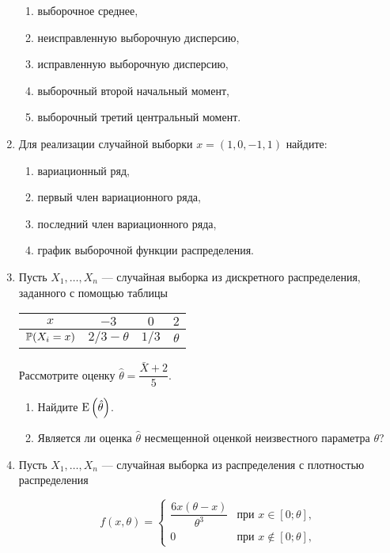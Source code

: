 \begin{enumerate}
\begin{enumerate}
\item выборочное среднее,
\item неисправленную выборочную дисперсию,
\item исправленную выборочную дисперсию,
\item выборочный второй начальный момент,
\item выборочный третий центральный момент.
\end{enumerate}

\item Для реализации случайной выборки $x=(1,0,-1,1)$ найдите:

\begin{enumerate}
\item вариационный ряд,
\item первый член вариационного ряда,
\item последний член вариационного ряда,
\item график выборочной функции распределения.
\end{enumerate}

\item Пусть $X_1, \ldots,X_n$ — случайная выборка из дискретного распределения, заданного с помощью таблицы

\begin{center}
\begin{tabular}{cccc}
\toprule
 $x$ & $-3$  &$ 0 $  & $2 $  \\
 \midrule
 $\P(X_i = x)$ & $2/3 - \theta$ & $1/3$ & $\theta$ \\
 \bottomrule
\end{tabular}
\end{center}

Рассмотрите оценку $\hat{\theta} = \dfrac{\bar{X}+2}{5}$.

\begin{enumerate}
    \item Найдите $\E\left(\hat{\theta}\right)$.
    \item Является ли оценка $\hat{\theta}$ несмещенной оценкой неизвестного
		параметра $\theta$?
\end{enumerate}

\item Пусть $X_1, \ldots ,X_n$ — случайная выборка из распределения
с плотностью распределения

\[
f(x,\theta) = \begin{cases}
\dfrac{6x(\theta - x)}{\theta^3} & \text{при } x \in [0;\theta], \\
0 & \text{при } x \not\in [0;\theta],
\end{cases}
\]


\end{enumerate}
